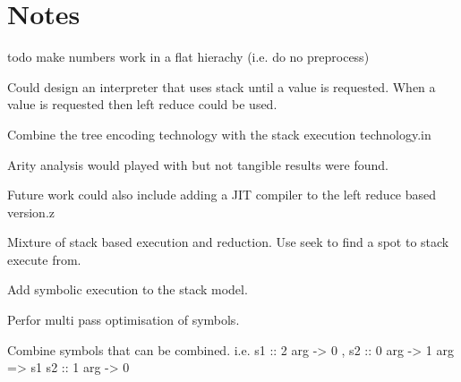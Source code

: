 \chapter{Notes}\label{C:notes}


todo make numbers work in a flat hierachy  (i.e. do no preprocess)

Could design an interpreter that uses stack until a value is requested. When a
value is requested then left reduce could be used.

Combine the tree encoding technology with the stack execution technology.in

Arity analysis would played with but not tangible results were found.

Future work could also include adding a JIT compiler to the left reduce based version.z


Mixture of stack based execution and reduction.
Use seek to find a spot to stack execute from.

Add symbolic execution to the stack model.

Perfor multi pass optimisation of symbols.

Combine symbols that can be combined. i.e. s1 :: 2 arg -> 0 , s2 :: 0 arg -> 1 arg => s1 s2 :: 1 arg -> 0